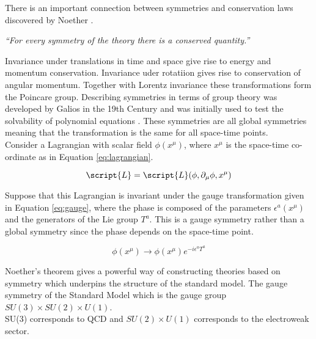There is an important connection between symmetries and conservation laws
discovered by Noether \cite{noether}.

\begin{center}
{\it ``For every symmetry of the theory there is a conserved quantity.''} \\
\end{center}

Invariance under translations in time and space give rise to energy and momentum
conservation. Invariance uder rotatiion gives rise to conservation of angular
momentum. Together with Lorentz invariance these transformations form the
Poincare group. Describing symmetries in terms of group theory was developed by
Galios in the 19th Century and was initially used to test the solvability of 
polynomial equations \cite{galois}. These symmetries are all global symmetries
meaning that the transformation is the same for all space-time points. \\

Consider a Lagrangian with scalar field $\phi(x^{\mu})$, where $x^{\mu}$ is the
space-time co-ordinate as in Equation \ref{eq:lagrangian}.

\begin{equation}
\script{L} = \script{L}(\phi, \partial_{\mu}\phi, x^{\mu})
\label{eq:lagrangian}
\end{equation}

Suppose that this Lagrangian is invariant under the gauge transformation given
in Equation \ref{eq:gauge}, where the phase is composed of the parameters 
$\epsilon^{a}\left(x^{\mu}\right)$ and the generators of the Lie group $T^{a}$. 
This is a gauge symmetry rather than a global symmetry since the phase depends 
on the space-time point. 

\begin{equation} 
\phi(x^{\mu})\rightarrow \phi(x^{\mu})e^{-i\epsilon^{a}T^{a}}
\label{eq:gauge}
\end{equation}

Noether's theorem gives a powerful way of constructing theories based on 
symmetry which underpins the structure of the standard model. The gauge
symmetry of the Standard Model which is the gauge group $SU(3)\times 
SU(2)\times U(1)$. \\

SU(3) corresponds to QCD and $SU(2)\times U(1)$ corresponds to the electroweak
sector. \\



